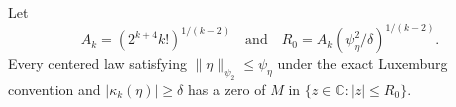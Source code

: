 Let
\[
 A_k=(2^{k+4}k!)^{1/(k-2)}
 \quad\text{and}\quad
 R_0=A_k(\psi_{\eta}^2/\delta)^{1/(k-2)}.
\]
Every centered law satisfying \(\|\eta\|_{\psi_2}\le\psi_{\eta}\) under the exact Luxemburg convention and \(|\kappa_k(\eta)|\ge\delta\) has a zero of \(M\) in \(\{z\in\mathbb C:|z|\le R_0\}\).